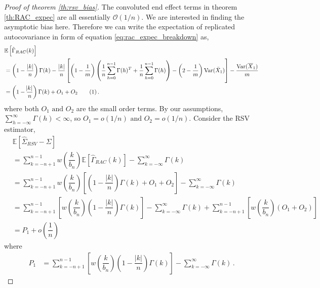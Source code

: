 \documentclass[11pt]{article}
\newcommand{\Var}{\text{Var}}
\newcommand\numberthis{\addtocounter{equation}{1}\tag{\theequation}}
\theoremstyle{remark}
\begin{document}
\begin{proof}[Proof of theorem \ref{th:rsv_bias}]
The convoluted end effect terms in theorem \ref{th:RAC_expec} are all essentially $\mathcal{O}(1/n)$. We are interested in finding the asymptotic bias here. Therefore we can write the expectation of replicated autocovariance in form of equation \ref{eq:rac_expec_breakdown} as,
\begin{align*}
&\mathbb{E} \left[\hat{\Gamma}_{RAC}(k) \right]\\
&  = \left(1- \dfrac{|k|}{n}\right)\Gamma(k) - \dfrac{|k|}{n}\left[\left(1-\dfrac{1}{m}\right)\left(\dfrac{1}{n}\sum_{h=0}^{n-1}\Gamma(h)^T + \dfrac{1}{n}\sum_{h=0}^{n-1}\Gamma(h)\right) - \left(2-\dfrac{1}{m}\right) \Var(\bar{X}_1)\right] - \dfrac{\Var(\overline{X}_1)}{m} \\
& = \left(1 - \dfrac{\abs{k}}{n}\right)\Gamma(k) + O_1 + O_2  \numberthis \label{eq:rac_bias2}  \,.
\end{align*}
%
%
where both $O_1 \textrm{ and } O_2$ are the small order terms. By our assumptions, $\sum_{h=-\infty}^{\infty}\Gamma(h) < \infty$, so $O_1 = o(1/n) \text{ and } O_2 = o(1/n)$.  Consider the RSV estimator,
\begin{align*}
    &\mathbb{E} \left[\hat{\Sigma}_{RSV} - \Sigma \right]\\
    &= \sum_{k=-n+1}^{n-1} w\left(\dfrac{k}{b_n}\right)\mathbb{E} \left[\hat{\Gamma}_{RAC}(k) \right] - \sum_{k=-\infty}^{\infty}\Gamma(k)\\
    &= \sum_{k=-n+1}^{n-1}  w\left(\dfrac{k}{b_n}\right)\left[\left(1-\dfrac{|k|}{n}\right)\Gamma(k) +O_1 + O_2\right]  - \sum_{k=-\infty}^{\infty}\Gamma(k)\\
    &= \sum_{k=-n+1}^{n-1} \left[ w\left(\dfrac{k}{b_n}\right)\left(1-\dfrac{|k|}{n}\right)\Gamma(k)\right]  - \sum_{k=-\infty}^{\infty}\Gamma(k) + \sum_{k=-n+1}^{n-1}\left[  w\left(\dfrac{k}{b_n}\right)\left(O_1 + O_2\right)\right] \\ 
    & = P_1 + o \left( \dfrac{1}{n} \right)\,
\end{align*}
%
where 
\begin{align*}
P_1 & = \sum\limits_{k=-n+1}^{n-1}\left[w\left(\dfrac{k}{b_n}\right)\left(1-\dfrac{|k|}{n}\right)\Gamma(k) \right] - \sum\limits_{k=-\infty}^{\infty}\Gamma(k)\,.

\end{align*}
\end{proof}
\end{document}
